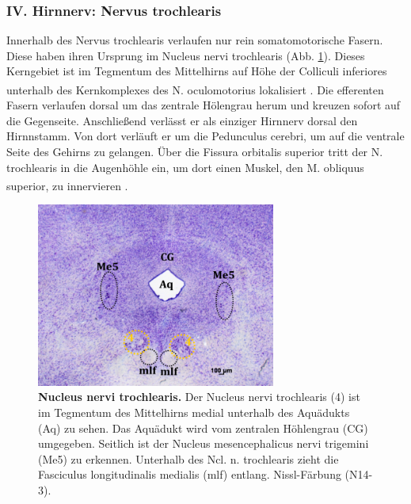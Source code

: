 \documentclass[12pt,a4paper,pdftex]{article}
\begin{document}
\subsubsection*{IV. Hirnnerv: Nervus trochlearis} 
Innerhalb des Nervus trochlearis verlaufen nur rein somatomotorische Fasern. Diese haben ihren Ursprung im Nucleus nervi trochlearis  (Abb. \ref{fig:nucleus_trochlearis}). Dieses Kerngebiet ist im Tegmentum des Mittelhirns auf Höhe der Colliculi inferiores unterhalb des Kernkomplexes des N. oculomotorius lokalisiert \textsuperscript{\cite[5]{trepel2011neuroanatomie}}. Die efferenten Fasern verlaufen dorsal um das zentrale Hölengrau herum und kreuzen sofort auf die Gegenseite. Anschließend verlässt er als einziger Hirnnerv dorsal den Hirnnstamm. Von dort verläuft er um die Pedunculus cerebri, um auf die ventrale Seite des Gehirns zu gelangen. Über die Fissura orbitalis superior tritt der N. trochlearis in die Augenhöhle ein, um dort einen Muskel, den M. obliquus superior, zu innervieren \textsuperscript{\cite[10]{crossman2014neuroanatomy}}.   

\begin{figure}[H]
    \centering
    \includegraphics[width=0.7\textwidth]{pictures/Bilder_Laura/nucleus_trochlearis_N14_3M_25x.png}
    \caption[Nucleus nervi trochlearis]{\textbf{Nucleus nervi trochlearis.} Der Nucleus nervi trochlearis (4) ist im Tegmentum des Mittelhirns medial unterhalb des Aquädukts (Aq) zu sehen. Das Aquädukt wird vom zentralen Höhlengrau (CG) umgegeben. Seitlich ist der  Nucleus mesencephalicus nervi trigemini (Me5) zu erkennen. Unterhalb des Ncl. n. trochlearis zieht die Fasciculus longitudinalis medialis (mlf) entlang. Nissl-Färbung (N14-3).}
    \label{fig:nucleus_trochlearis}
\end{figure}
\end{document}
